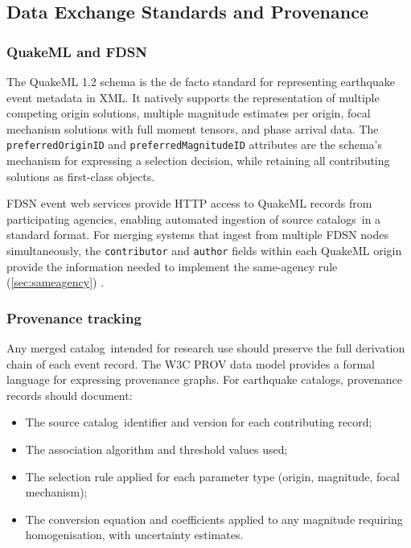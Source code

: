 \documentclass[12pt]{article}
\newcommand{\catalog}{catalog}
\newcommand{\catalogs}{catalogs}
\begin{document}
\subsection{Data Exchange Standards and Provenance}
\label{sec:standards}

\subsubsection{QuakeML and FDSN}

The QuakeML 1.2 schema \citep{QuakeML} is the de facto standard for representing
earthquake event metadata in XML.  It natively supports the representation of
multiple competing origin solutions, multiple magnitude estimates per origin,
focal mechanism solutions with full moment tensors, and phase arrival data.
The \texttt{preferredOriginID} and \texttt{preferredMagnitudeID} attributes
are the schema's mechanism for expressing a selection decision, while retaining
all contributing solutions as first-class objects.

FDSN event web services \citep{USGSFDSN} provide HTTP access to QuakeML records
from participating agencies, enabling automated ingestion of source \catalogs\
in a standard format.  For merging systems that ingest from multiple FDSN nodes
simultaneously, the \texttt{contributor} and \texttt{author} fields within each
QuakeML origin provide the information needed to implement the same-agency rule
(\cref{sec:sameagency}) \citep{QuakeML, USGSFDSN}.

\subsubsection{Provenance tracking}

Any merged \catalog\ intended for research use should preserve the full
derivation chain of each event record.  The W3C PROV data model
\citep{PROVO} provides a formal language for expressing provenance graphs.
For earthquake \catalogs, provenance records should document:

\begin{itemize}
  \item The source \catalog\ identifier and version for each contributing record;
  \item The association algorithm and threshold values used;
  \item The selection rule applied for each parameter type (origin, magnitude,
        focal mechanism);
  \item The conversion equation and coefficients applied to any magnitude
        requiring homogenisation, with uncertainty estimates.
\end{itemize}
\end{document}

